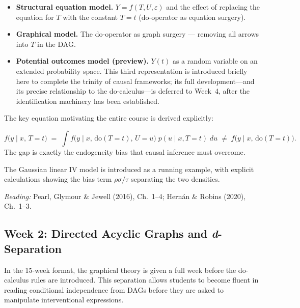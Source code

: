 \documentclass[12pt]{article}
\begin{document}
\begin{itemize}
  \item \textbf{Structural equation model.}
    $Y = f(T, U, \varepsilon)$ and the effect of replacing the equation for
    $T$ with the constant $T = t$ (do-operator as equation surgery).

  \item \textbf{Graphical model.}
    The do-operator as graph surgery --- removing all arrows into $T$ in the
    DAG.

  \item \textbf{Potential outcomes model (preview).}
    $Y(t)$ as a random variable on an extended probability space.
    This third representation is introduced briefly here to complete
    the trinity of causal frameworks; its full development---and its
    precise relationship to the do-calculus---is deferred to Week~4,
    after the identification machinery has been established.
\end{itemize}

The key equation motivating the entire course is derived explicitly:
\begin{keybox}
\[
  f\!\bigl(y \mid x,\, T{=}t\bigr)
  \;=\;
  \int f\!\bigl(y \mid x,\,\mathrm{do}(T{=}t),\, U{=}u\bigr)\;
       p(u \mid x, T{=}t)\; du
  \;\neq\;
  f\!\bigl(y \mid x,\,\mathrm{do}(T{=}t)\bigr).
\]
The gap is exactly the endogeneity bias that causal inference must overcome.
\end{keybox}

The Gaussian linear IV model is introduced as a running example, with
explicit calculations showing the bias term $\rho\sigma/\tau$ separating
the two densities.

\smallskip
\noindent\textit{Reading:} Pearl, Glymour \& Jewell (2016), Ch.~1--4;
Hern\'an \& Robins (2020), Ch.~1--3.

\subsection{Week 2: Directed Acyclic Graphs and \textit{d}-Separation}

In the 15-week format, the graphical theory is given a full week before
the do-calculus rules are introduced. This separation allows students to
become fluent in reading conditional independence from DAGs before they
are asked to manipulate interventional expressions.
\end{document}
